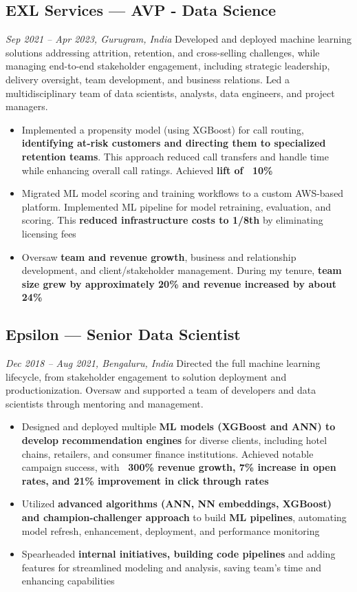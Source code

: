 \documentclass[a4paper,10pt]{article}
\begin{document}
\subsection*{EXL Services — AVP - Data Science}
\textit{Sep 2021 – Apr 2023, Gurugram, India}
Developed and deployed machine learning solutions addressing attrition, retention, and cross-selling challenges, while managing end-to-end stakeholder engagement, including strategic leadership, delivery oversight, team development, and business relations. Led a multidisciplinary team of data scientists, analysts, data engineers, and project managers.
\begin{itemize}[leftmargin=1em]
    \item Implemented a propensity model (using XGBoost) for call routing, \textbf{identifying at-risk customers and directing them to specialized retention teams}. This approach reduced call transfers and handle time while enhancing overall call ratings. Achieved \textbf{lift of ~10\%}
    \item Migrated ML model scoring and training workflows to a custom AWS-based platform. Implemented ML pipeline for model retraining, evaluation, and scoring. This \textbf{reduced infrastructure costs to 1/8th} by eliminating licensing fees
    \item Oversaw \textbf{team and revenue growth}, business and relationship development, and client/stakeholder management. During my tenure, \textbf{team size grew by approximately 20\% and revenue increased by about 24\%}
\end{itemize}

\subsection*{Epsilon — Senior Data Scientist}
\textit{Dec 2018 – Aug 2021, Bengaluru, India}
Directed the full machine learning lifecycle, from stakeholder engagement to solution deployment and productionization. Oversaw and supported a team of developers and data scientists through mentoring and management.
\begin{itemize}[leftmargin=1em]
    \item Designed and deployed multiple \textbf{ML models (XGBoost and ANN) to develop recommendation engines} for diverse clients, including hotel chains, retailers, and consumer finance institutions. Achieved notable campaign success, with \textbf{~300\% revenue growth, 7\% increase in open rates, and 21\% improvement in click through rates}
    \item Utilized \textbf{advanced algorithms (ANN, NN embeddings, XGBoost) and champion-challenger approach} to build \textbf{ML pipelines}, automating model refresh, enhancement, deployment, and performance monitoring
    \item Spearheaded \textbf{internal initiatives, building code pipelines} and adding features for streamlined modeling and analysis, saving team's time and enhancing capabilities
\end{itemize}
\end{document}
